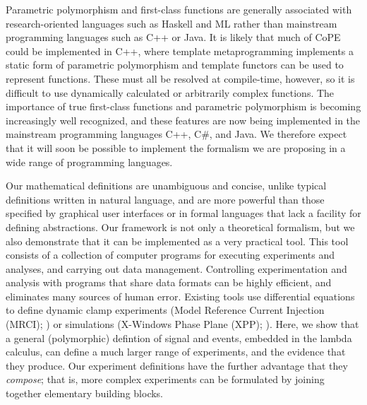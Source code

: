 Parametric polymorphism and first-class functions are generally
associated with research-oriented languages such as Haskell and ML
rather than mainstream programming languages such as C++ or Java. It
is likely that much of CoPE could be implemented in C++, where
template metaprogramming implements a static form of parametric
polymorphism and template functors can be used to represent
functions. These must all be resolved at compile-time, however, so it
is difficult to use dynamically calculated or arbitrarily complex
functions. The importance of true first-class functions and parametric
polymorphism is becoming increasingly well recognized, and these
features are now being implemented in the mainstream programming
languages C++, C\#, and Java. We therefore expect that it will
soon be possible to implement the formalism we are proposing in a wide
range of programming languages.

%
% 
%
Our mathematical definitions are unambiguous and concise, unlike
typical definitions written in natural language, and are more powerful
than those specified by graphical user interfaces or in formal
languages that lack a facility for defining abstractions. Our
framework is not only a theoretical formalism, but we also demonstrate
that it can be implemented as a very practical tool. This tool
consists of a collection of computer programs for executing
experiments and analyses, and carrying out data
management. Controlling experimentation and analysis with programs
that share data formats can be highly efficient, and eliminates many
sources of human error. Existing tools use differential equations to
define dynamic clamp experiments (Model Reference Current Injection
(MRCI); \citep{Raikov2004}) or simulations (X-Windows Phase Plane
(XPP); \citep{Ermentrout1987}). Here, we show that a general
(polymorphic) defintion of signal and events, embedded in the lambda
calculus, can define a much larger range of experiments, and the
evidence that they produce. Our experiment definitions have the
further advantage that they \emph{compose}; that is, more complex
experiments can be formulated by joining together elementary building
blocks.

